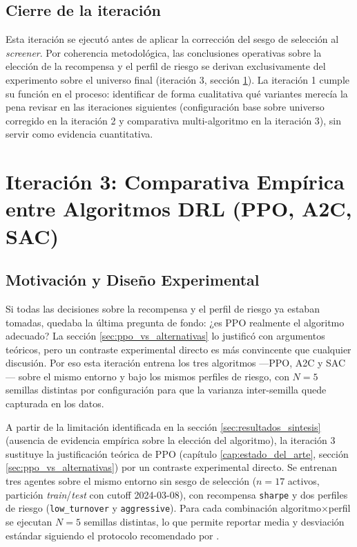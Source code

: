 \documentclass[IB,a4paper]{TFUOC}
\begin{document}
\subsection{Cierre de la iteración}

Esta iteración se ejecutó antes de aplicar la corrección del sesgo de selección al \textit{screener}. Por coherencia metodológica, las conclusiones operativas sobre la elección de la recompensa y el perfil de riesgo se derivan exclusivamente del experimento sobre el universo final (iteración 3, sección \ref{sec:resultados_iter3}). La iteración 1 cumple su función en el proceso: identificar de forma cualitativa qué variantes merecía la pena revisar en las iteraciones siguientes (configuración base sobre universo corregido en la iteración 2 y comparativa multi-algoritmo en la iteración 3), sin servir como evidencia cuantitativa.

\section{Iteración 3: Comparativa Empírica entre Algoritmos DRL (PPO, A2C, SAC)}
\label{sec:resultados_iter3}

\subsection{Motivación y Diseño Experimental}

Si todas las decisiones sobre la recompensa y el perfil de riesgo ya estaban tomadas, quedaba la última pregunta de fondo: ¿es PPO realmente el algoritmo adecuado? La sección \ref{sec:ppo_vs_alternativas} lo justificó con argumentos teóricos, pero un contraste experimental directo es más convincente que cualquier discusión. Por eso esta iteración entrena los tres algoritmos —PPO, A2C y SAC— sobre el mismo entorno y bajo los mismos perfiles de riesgo, con $N=5$ semillas distintas por configuración para que la varianza inter-semilla quede capturada en los datos.

A partir de la limitación identificada en la sección \ref{sec:resultados_sintesis} (ausencia de evidencia empírica sobre la elección del algoritmo), la iteración 3 sustituye la justificación teórica de PPO (capítulo \ref{cap:estado_del_arte}, sección \ref{sec:ppo_vs_alternativas}) por un contraste experimental directo. Se entrenan tres agentes sobre el mismo entorno sin sesgo de selección ($n=17$ activos, partición \textit{train}/\textit{test} con cutoff 2024-03-08), con recompensa \texttt{sharpe} y dos perfiles de riesgo (\texttt{low\_turnover} y \texttt{aggressive}). Para cada combinación algoritmo$\times$perfil se ejecutan $N=5$ semillas distintas, lo que permite reportar media y desviación estándar siguiendo el protocolo recomendado por \citet{henderson2018deeprl}.
\end{document}
